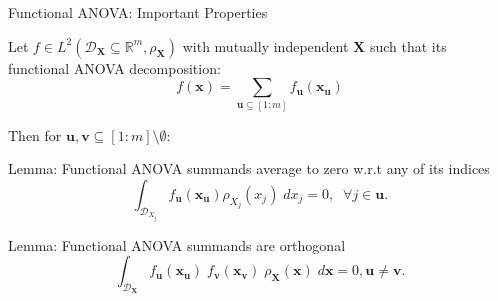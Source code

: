 \documentclass[english,aspectratio=169]{beamer}
\let\tempone\itemize
\let\temptwo\enditemize
\renewenvironment{itemize}{\tempone\addtolength{\itemsep}{0.35\baselineskip}}{\temptwo}
\renewcommand{\emph}[1]{\textcolor[HTML]{006d2c}{\fontseries{sb}\selectfont #1}}
\begin{document}
\begin{frame}[fragile]{Functional ANOVA: Important Properties}
\small

Let $f \in L^2(\mathcal{D}_{\boldsymbol{X}} \subseteq \mathbb{R}^m, \rho_{\boldsymbol{X}})$ with mutually independent $\bm{X}$ such that its functional ANOVA decomposition:
\begin{equation*}
  f(\bm{x}) = \sum_{\bm{u} \subseteq [1: m]} f_{\bm{u}} (\bm{x}_{\bm{u}})
\end{equation*}

Then for $\bm{u}, \bm{v} \subseteq [1:m] \setminus \emptyset$:
\vspace{0.5em}
\begin{itemize}
  \item \emph{Lemma}: Functional ANOVA summands average to zero w.r.t any of its indices
  \begin{equation*}
    \int_{\mathcal{D}_{X_j}} f_{\bm{u}} (\bm{x}_{\bm{u}}) \rho_{X_j} (x_j) \; dx_j = 0,\;\; \forall j \in \bm{u}.
  \end{equation*}
  \item \emph{Lemma}: Functional ANOVA summands are orthogonal
  \begin{equation*}
    \int_{\mathcal{D}_{\bm{X}}} f_{\bm{u}} (\bm{x}_{\bm{u}}) \; f_{\bm{v}} (\bm{x}_{\bm{v}}) \; \rho_{\bm{X}} (\bm{x}) \; d\bm{x} = 0, \bm{u} \neq \bm{v}.
  \end{equation*}
\end{itemize}

\end{frame}
\end{document}
